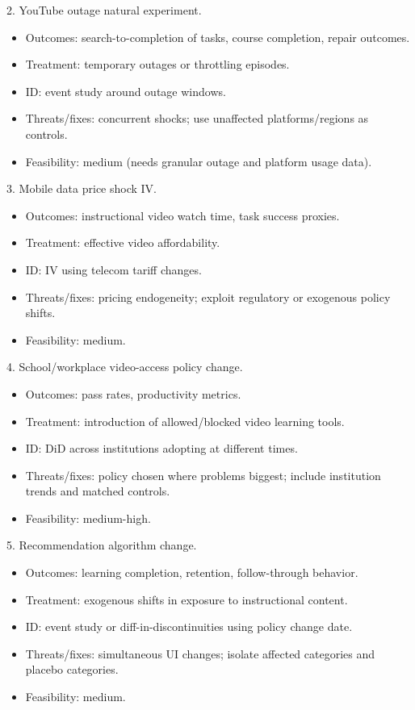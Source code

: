 \documentclass[11pt]{article}
\begin{document}
2. YouTube outage natural experiment.\\
\begin{itemize}
\item Outcomes: search-to-completion of tasks, course completion, repair outcomes.
\item Treatment: temporary outages or throttling episodes.
\item ID: event study around outage windows.
\item Threats/fixes: concurrent shocks; use unaffected platforms/regions as controls.
\item Feasibility: medium (needs granular outage and platform usage data).
\end{itemize}

3. Mobile data price shock IV.\\
\begin{itemize}
\item Outcomes: instructional video watch time, task success proxies.
\item Treatment: effective video affordability.
\item ID: IV using telecom tariff changes.
\item Threats/fixes: pricing endogeneity; exploit regulatory or exogenous policy shifts.
\item Feasibility: medium.
\end{itemize}

4. School/workplace video-access policy change.\\
\begin{itemize}
\item Outcomes: pass rates, productivity metrics.
\item Treatment: introduction of allowed/blocked video learning tools.
\item ID: DiD across institutions adopting at different times.
\item Threats/fixes: policy chosen where problems biggest; include institution trends and matched controls.
\item Feasibility: medium-high.
\end{itemize}

5. Recommendation algorithm change.\\
\begin{itemize}
\item Outcomes: learning completion, retention, follow-through behavior.
\item Treatment: exogenous shifts in exposure to instructional content.
\item ID: event study or diff-in-discontinuities using policy change date.
\item Threats/fixes: simultaneous UI changes; isolate affected categories and placebo categories.
\item Feasibility: medium.
\end{itemize}
\end{document}
